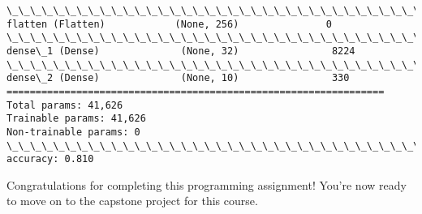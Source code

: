 \documentclass[11pt]{article}
\begin{document}
\begin{Verbatim}[commandchars=\\\{\}]
\_\_\_\_\_\_\_\_\_\_\_\_\_\_\_\_\_\_\_\_\_\_\_\_\_\_\_\_\_\_\_\_\_\_\_\_\_\_\_\_\_\_\_\_\_\_\_\_\_\_\_\_\_\_\_\_\_\_\_\_\_\_\_\_\_
flatten (Flatten)            (None, 256)               0         
\_\_\_\_\_\_\_\_\_\_\_\_\_\_\_\_\_\_\_\_\_\_\_\_\_\_\_\_\_\_\_\_\_\_\_\_\_\_\_\_\_\_\_\_\_\_\_\_\_\_\_\_\_\_\_\_\_\_\_\_\_\_\_\_\_
dense\_1 (Dense)              (None, 32)                8224      
\_\_\_\_\_\_\_\_\_\_\_\_\_\_\_\_\_\_\_\_\_\_\_\_\_\_\_\_\_\_\_\_\_\_\_\_\_\_\_\_\_\_\_\_\_\_\_\_\_\_\_\_\_\_\_\_\_\_\_\_\_\_\_\_\_
dense\_2 (Dense)              (None, 10)                330       
=================================================================
Total params: 41,626
Trainable params: 41,626
Non-trainable params: 0
\_\_\_\_\_\_\_\_\_\_\_\_\_\_\_\_\_\_\_\_\_\_\_\_\_\_\_\_\_\_\_\_\_\_\_\_\_\_\_\_\_\_\_\_\_\_\_\_\_\_\_\_\_\_\_\_\_\_\_\_\_\_\_\_\_
accuracy: 0.810

    \end{Verbatim}

    Congratulations for completing this programming assignment! You're now
ready to move on to the capstone project for this course.


    
    
    
    
\end{document}
